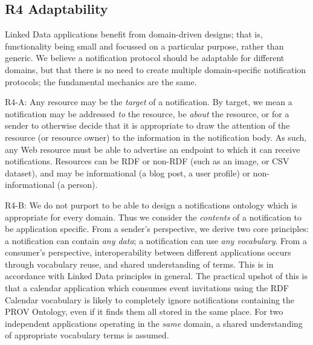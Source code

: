                             

                            
                                \subsection{R4 Adaptability}
  \label{adaptability}

                                
                                    
                                    
                                    
\par Linked Data applications benefit from domain-driven designs; that is, functionality being small and focussed on a particular purpose, rather than generic. We believe a notification protocol should be adaptable for different domains, but that there is no need to create multiple domain-specific notification protocols; the fundamental mechanics are the same.

                                    
\par R4-A: Any resource may be the {\em target} of a notification. By target, we mean a notification may be addressed {\em to} the resource, be {\em about} the resource, or for a sender to otherwise decide that it is appropriate to draw the attention of the resource (or resource owner) to the information in the notification body. As such, any Web resource must be able to advertise an endpoint to which it can receive notifications. Resources can be RDF or non-RDF (such as an image, or CSV dataset), and may be informational (a blog post, a user profile) or non-informational (a person).

                                    
\par R4-B: We do not purport to be able to design a notifications ontology which is appropriate for every domain. Thus we consider the {\em contents} of a notification to be application specific. From a sender’s perspective, we derive two core principles: a notification can contain {\em any data}; a notification can use {\em any vocabulary}. From a consumer’s perspective, interoperability between different applications occurs through vocabulary reuse, and shared understanding of terms. This is in accordance with Linked Data principles in general. The practical upshot of this is that a calendar application which consumes event invitations using the \empty RDF Calendar vocabulary is likely to completely ignore notifications containing the \empty PROV Ontology, even if it finds them all stored in the same place. For two independent applications operating in the {\em same} domain, a shared understanding of appropriate vocabulary terms is assumed.

